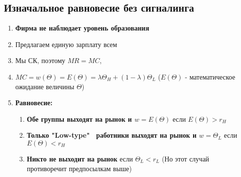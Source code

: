 \subsection{Изначальное равновесие без сигналинга}
\begin{enumerate}
    \item \textbf{Фирма не наблюдает уровень образования}
    \item Предлагаем единую зарплату всем
    \item Мы СК, поэтому $MR=MC$,
    \item $MC=w(\Theta)=E(\Theta)=\lambda\Theta_H+(1-\lambda)\Theta_L$ ($E(\Theta)$ - математическое ожидание величины $\Theta$)
    \item \textbf{Равновесие:} \begin{enumerate}
        \item \textbf{Обе группы выходят на рынок и $w=E(\Theta)$} если $E(\Theta)>r_H$
        \item \textbf{Только "Low-type" \ работники выходят на рынок и $w=\Theta_L$} если $E(\Theta)<r_H$
        \item \textbf{Никто не выходит на рынок} если $\Theta_L<r_L$ (Но этот случай противоречит предпосылкам выше)
    \end{enumerate}
\end{enumerate}

